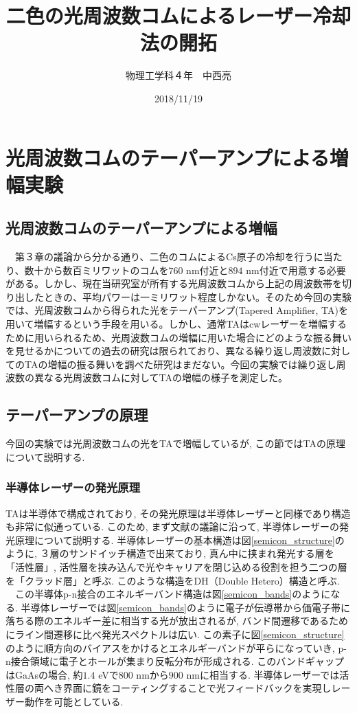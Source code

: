 \documentclass[uplatex, dvipdfmx, a4paper, report, papersize, 11pt]{jsbook}
\title{二色の光周波数コムによるレーザー冷却法の開拓}
\author{物理工学科４年　中西亮}
\date{2018/11/19}
\begin{document}
\maketitle
\newpage

\setcounter{tocdepth}{2}
\tableofcontents

\newpage
\chapter{光周波数コムのテーパーアンプによる増幅実験}

\section{光周波数コムのテーパーアンプによる増幅}
　第３章の議論から分かる通り、二色のコムによるCs原子の冷却を行うに当たり、数十から数百ミリワットのコムを$760$ nm付近と$894$ nm付近で用意する必要がある。しかし、現在当研究室が所有する光周波数コムから上記の周波数帯を切り出したときの、平均パワーは一ミリワット程度しかない。そのため今回の実験では、光周波数コムから得られた光をテーパーアンプ(Tapered Amplifier,  TA)を用いて増幅するという手段を用いる。しかし、通常TAはcwレーザーを増幅するために用いられるため、光周波数コムの増幅に用いた場合にどのような振る舞いを見せるかについての過去の研究は限られており、異なる繰り返し周波数に対してのTAの増幅の振る舞いを調べた研究はまだない。今回の実験では繰り返し周波数の異なる光周波数コムに対してTAの増幅の様子を測定した。

\section{テーパーアンプの原理}
今回の実験では光周波数コムの光をTAで増幅しているが, この節ではTAの原理について説明する.

\subsection{半導体レーザーの発光原理}
TAは半導体で構成されており, その発光原理は半導体レーザーと同様であり構造も非常に似通っている. このため, まず文献\cite{わかる半導体レーザーの基礎と応用}の議論に沿って, 半導体レーザーの発光原理について説明する. 半導体レーザーの基本構造は図\ref{semicon_structure}のように, ３層のサンドイッチ構造で出来ており, 真ん中に挟まれ発光する層を「活性層」, 活性層を挟み込んで光やキャリアを閉じ込める役割を担う二つの層を「クラッド層」と呼ぶ. このような構造をDH（Double Hetero）構造と呼ぶ.\\
　この半導体p-n接合のエネルギーバンド構造は図\ref{semicon_bands}のようになる. 半導体レーザーでは図\ref{semicon_bands}のように電子が伝導帯から価電子帯に落ちる際のエネルギー差に相当する光が放出されるが, バンド間遷移であるためにライン間遷移に比べ発光スペクトルは広い. この素子に図\ref{semicon_structure}のように順方向のバイアスをかけるとエネルギーバンドが平らになっていき, p-n接合領域に電子とホールが集まり反転分布が形成される. このバンドギャップはGaAsの場合, 約$1.4$ eVで$800$ nmから$900$ nmに相当する\cite{grynberg_aspect_fabre_cohen-tannoudji_2010}. 半導体レーザーでは活性層の両へき界面に鏡をコーティングすることで光フィードバックを実現しレーザー動作を可能としている.
\end{document}
